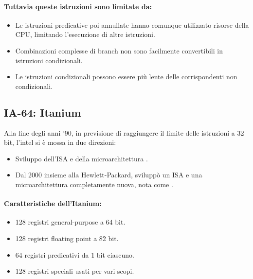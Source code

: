 \paragraph{Tuttavia queste istruzioni sono limitate da:}

\begin{itemize}
  \item Le istruzioni predicative poi annullate hanno comunque utilizzato
risorse della CPU, limitando l’esecuzione di altre istruzioni.
\item Combinazioni complesse di branch non sono facilmente
convertibili in istruzioni condizionali. 
\item Le istruzioni condizionali possono essere più lente delle
corrispondenti non condizionali.
\end{itemize}


\subsection{IA-64: Itanium}

Alla fine degli anni '90, in previsione di raggiungere il limite delle istruzioni a 32 bit, l'intel si è mossa in due direzioni: 

\begin{itemize}
  \item Sviluppo dell'ISA e della microarchitettura . 
  \item Dal 2000 insieme alla Hewlett-Packard, sviluppò un ISA e una microarchitettura completamente nuova, nota come .
\end{itemize}


\paragraph{Caratteristiche dell'Itanium:}

\begin{itemize}
  \item 128 registri general-purpose a 64 bit.
  \item 128 registri floating point a 82 bit.
  \item 64 registri predicativi da 1 bit ciascuno. 
  \item 128 registri speciali usati per vari scopi.
\end{itemize}





